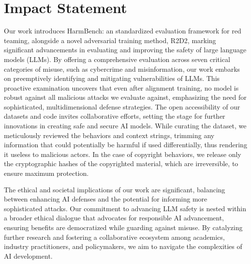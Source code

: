 \documentclass{article}
\theoremstyle{plain}
\theoremstyle{definition}
\theoremstyle{remark}
\begin{document}








\section*{Impact Statement}
Our work introduces HarmBench: an standardized evaluation framework for red teaming, alongside a novel adversarial training method, R2D2, marking significant advancements in evaluating and improving the safety of large language models (LLMs). By offering a comprehensive evaluation across seven critical categories of misuse, such as cybercrime and misinformation, our work embarks on preemptively identifying and mitigating vulnerabilities of LLMs. This proactive examination uncovers that even after alignment training, no model is robust against all malicious attacks we evaluate against, emphasizing the need for sophisticated, multidimensional defense strategies. The open accessibility of our datasets and code invites collaborative efforts, setting the stage for further innovations in creating safe and secure AI models. While curating the dataset, we meticulously reviewed the behaviors and context strings, trimming any information that could potentially be harmful if used differentially, thus rendering it useless to malicious actors. In the case of copyright behaviors, we release only the cryptographic hashes of the copyrighted material, which are irreversible, to ensure maximum protection.

The ethical and societal implications of our work are significant, balancing between enhancing AI defenses and the potential for informing more sophisticated attacks. Our commitment to advancing LLM safety is nested within a broader ethical dialogue that advocates for responsible AI advancement, ensuring benefits are democratized while guarding against misuse. By catalyzing further research and fostering a collaborative ecosystem among academics, industry practitioners, and policymakers, we aim to navigate the complexities of AI development.







\newpage
\appendix
\onecolumn


\end{document}
